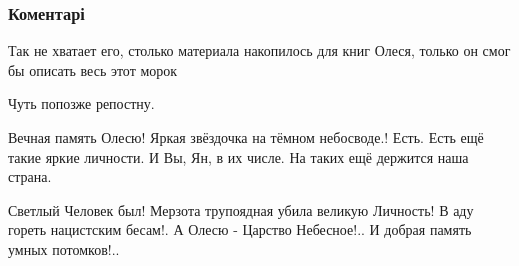  
 
 
 
 
\subsubsection{Коментарі}

\begin{itemize} %
Так не хватает его, столько материала накопилось для книг Олеся, только он смог бы описать весь этот морок

Чуть попозже репостну.

Вечная память Олесю! Яркая звёздочка на тёмном небосводе.! Есть. Есть ещё такие яркие личности. И Вы, Ян, в их числе. На таких ещё держится наша страна.


Светлый Человек был! Мерзота трупоядная убила великую Личность! В аду гореть
нацистским бесам!. А Олесю - Царство Небесное!.. И добрая память умных
потомков!..

\end{itemize} %
